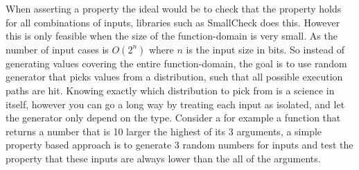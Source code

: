 \par When asserting a property the ideal would be to check that the property holds for all combinations of inputs, libraries such as SmallCheck does this. However this is only feasible when the size of the function-domain is very small. As the number of input cases is $O(2^n)$ where $n$ is the input size in bits. 
So instead of generating values covering the entire function-domain, the goal is to use random generator that picks values from a distribution, such that all possible execution paths are hit. Knowing exactly which distribution to pick from is a science in itself, however you can go a long way by treating each input as isolated, and let the generator only depend on the type. Consider a for example a function that returns a number that is 10 larger the highest of its 3 arguments, a simple property based approach is to generate 3 random numbers for inputs and test the property that these inputs are always lower than the all of the arguments.

